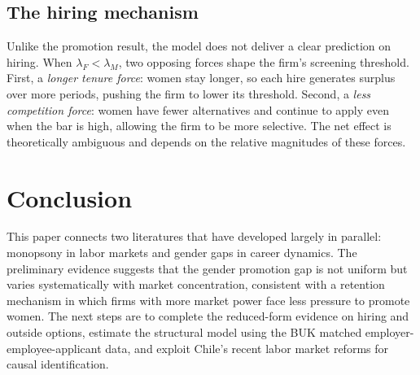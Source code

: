 \documentclass[11pt]{article}
\begin{document}
\subsection{The hiring mechanism}

Unlike the promotion result, the model does not deliver a clear prediction on hiring. When $\lambda_F < \lambda_M$, two opposing forces shape the firm's screening threshold. First, a \textit{longer tenure force}: women stay longer, so each hire generates surplus over more periods, pushing the firm to lower its threshold. Second, a \textit{less competition force}: women have fewer alternatives and continue to apply even when the bar is high, allowing the firm to be more selective. The net effect is theoretically ambiguous and depends on the relative magnitudes of these forces.



\section{Conclusion}

This paper connects two literatures that have developed largely in parallel: monopsony in labor markets and gender gaps in career dynamics. The preliminary evidence suggests that the gender promotion gap is not uniform but varies systematically with market concentration, consistent with a retention mechanism in which firms with more market power face less pressure to promote women. The next steps are to complete the reduced-form evidence on hiring and outside options, estimate the structural model using the BUK matched employer-employee-applicant data, and exploit Chile's recent labor market reforms for causal identification.
\end{document}
